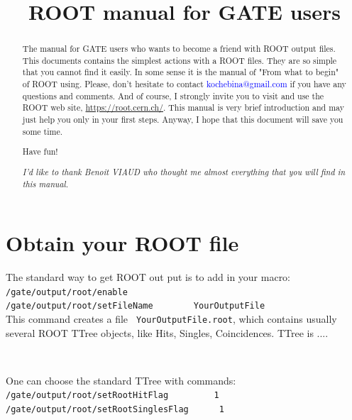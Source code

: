 \documentclass[12pt]{article}
\begin{document}



\title{ROOT manual for GATE users}
\tableofcontents
\newpage
\begin{abstract}
The manual for GATE users who wants to become a friend with ROOT output files. This documents contains the simplest actions with a ROOT files. They are so simple that you cannot find it easily. In some sense it is the manual of "From what to begin" of ROOT using.  Please, don't hesitate to contact \textcolor{blue}{kochebina@gmail.com} if you have any questions and comments. And of course, I strongly invite you to visit and use the ROOT web site, \href{https://root.cern.ch/}{https://root.cern.ch/}. This manual is very brief introduction and may just help you only in your first steps. Anyway, I hope that this document will save you some time.
\begin{center}
Have fun!
\end{center}
 

\vspace*{10cm}

\textit{I'd like to thank Benoit VIAUD who thought me almost everything that you will find in this manual.}   
\end{abstract}



\pagebreak


\section{Obtain your ROOT file}
The standard way to get ROOT out put is to add in your macro:
\\
\verb|/gate/output/root/enable | \\
\verb|/gate/output/root/setFileName        YourOutputFile|
\\
This command creates a file \verb| YourOutputFile.root|, which contains usually several ROOT TTree objects, like Hits, Singles, Coincidences. TTree is .... 

\

One can choose the standard TTree with commands:\\
\verb|/gate/output/root/setRootHitFlag         1| \\
\verb|/gate/output/root/setRootSinglesFlag      1|
\end{document}
